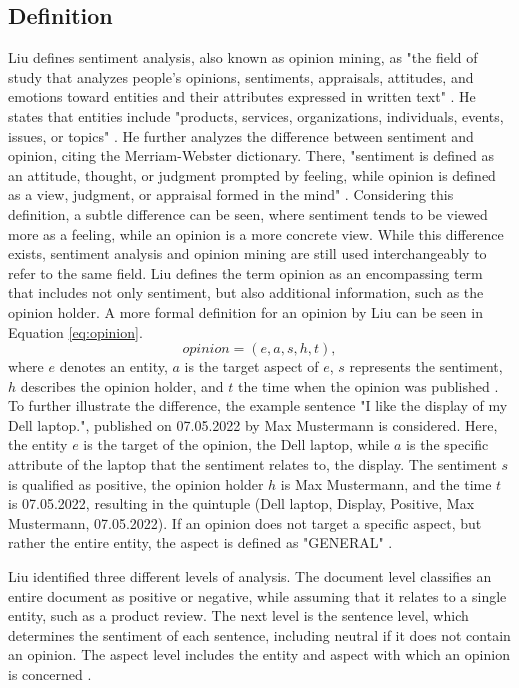 \subsection{Definition}


Liu defines sentiment analysis, also known as opinion mining, as "the field of study that analyzes people's opinions, sentiments, appraisals, attitudes, and emotions toward entities and their attributes expressed in written text" \cite[p.~1]{liu_2015}. He states that entities include "products, services, organizations, individuals, events, issues, or topics" \cite[p.~1]{liu_2015}. He further analyzes the difference between sentiment and opinion, citing the Merriam-Webster dictionary. There, "sentiment is defined as an attitude, thought, or judgment prompted by feeling, while opinion is defined as a view, judgment, or appraisal formed in the mind" \cite[p.~2]{liu_2015}. Considering this definition, a subtle difference can be seen, where sentiment tends to be viewed more as a feeling, while an opinion is a more concrete view. While this difference exists, sentiment analysis and opinion mining are still used interchangeably to refer to the same field. Liu defines the term opinion as an encompassing term that includes not only sentiment, but also additional information, such as the opinion holder. A more formal definition for an opinion by Liu can be seen in Equation \eqref{eq:opinion}.
\begin{equation}
    opinion = (e, a, s, h, t),
    \label{eq:opinion}
\end{equation}
where $e$ denotes an entity, $a$ is the target aspect of $e$, $s$ represents the sentiment, $h$ describes the opinion holder, and $t$ the time when the opinion was published \cite{liu_2015}. To further illustrate the difference, the example sentence "I like the display of my Dell laptop.", published on 07.05.2022 by Max Mustermann is considered. Here, the entity $e$ is the target of the opinion, the Dell laptop, while $a$ is the specific attribute of the laptop that the sentiment relates to, the display. The sentiment $s$ is qualified as positive, the opinion holder $h$ is Max Mustermann, and the time $t$ is 07.05.2022, resulting in the quintuple (Dell laptop, Display, Positive, Max Mustermann, 07.05.2022). If an opinion does not target a specific aspect, but rather the entire entity, the aspect is defined as "GENERAL" \cite{liu_2015}. 


Liu identified three different levels of analysis. The document level classifies an entire document as positive or negative, while assuming that it relates to a single entity, such as a product review. The next level is the sentence level, which determines the sentiment of each sentence, including neutral if it does not contain an opinion. The aspect level includes the entity and aspect with which an opinion is concerned \cite{liu_2015}.

